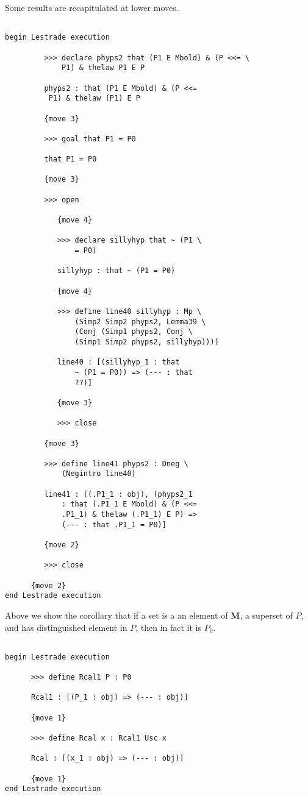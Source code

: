 \documentclass[12pt]{article}
\begin{document}
Some results are recapitulated at lower moves.

\begin{verbatim}

begin Lestrade execution

         >>> declare phyps2 that (P1 E Mbold) & (P <<= \
             P1) & thelaw P1 E P

         phyps2 : that (P1 E Mbold) & (P <<= 
          P1) & thelaw (P1) E P

         {move 3}

         >>> goal that P1 = P0

         that P1 = P0

         {move 3}

         >>> open

            {move 4}

            >>> declare sillyhyp that ~ (P1 \
                = P0)

            sillyhyp : that ~ (P1 = P0)

            {move 4}

            >>> define line40 sillyhyp : Mp \
                (Simp2 Simp2 phyps2, Lemma39 \
                (Conj (Simp1 phyps2, Conj \
                (Simp1 Simp2 phyps2, sillyhyp))))

            line40 : [(sillyhyp_1 : that 
                ~ (P1 = P0)) => (--- : that 
                ??)]

            {move 3}

            >>> close

         {move 3}

         >>> define line41 phyps2 : Dneg \
             (Negintro line40)

         line41 : [(.P1_1 : obj), (phyps2_1 
             : that (.P1_1 E Mbold) & (P <<= 
             .P1_1) & thelaw (.P1_1) E P) => 
             (--- : that .P1_1 = P0)]

         {move 2}

         >>> close

      {move 2}
end Lestrade execution
\end{verbatim}

Above we show the corollary that if a set is a an element of {\bf M}, a superset of $P$, and has distinguished element in $P$, then in fact it is $P_0$.

\begin{verbatim}

begin Lestrade execution

      >>> define Rcal1 P : P0

      Rcal1 : [(P_1 : obj) => (--- : obj)]

      {move 1}

      >>> define Rcal x : Rcal1 Usc x

      Rcal : [(x_1 : obj) => (--- : obj)]

      {move 1}
end Lestrade execution
\end{verbatim}
\end{document}
